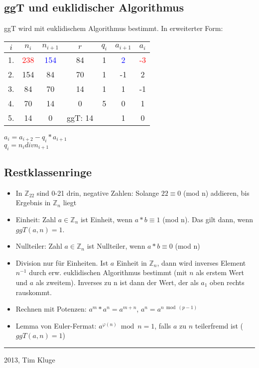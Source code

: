 \documentclass[12pt,landscape]{article}
\begin{document}
\begin{multicols}{3}
\subsection{ggT und euklidischer Algorithmus}
ggT wird mit euklidischem Algorithmus bestimmt. In erweiterter Form:
\begin{tabular}{|c|c|c|c|c|c|c|}
\hline \rule[-2ex]{0pt}{5.5ex} $i$ & $n_i$ & $n_{i+1}$ &  $r$ & $q_i$ & $a_{i+1}$ & $a{_i}$ \\ 
\hline \rule[-2ex]{0pt}{5.5ex} 1. & \textcolor{red}{238} & \textcolor{blue}{154} & 84 & 1 & \textcolor{blue}{2} & \textcolor{red}{-3} \\ 
\hline \rule[-2ex]{0pt}{5.5ex} 2. & 154 &  84 & 70 & 1 & -1 & 2 \\ 
\hline \rule[-2ex]{0pt}{5.5ex} 3. & 84 & 70 & 14 & 1 & 1 & -1 \\ 
\hline \rule[-2ex]{0pt}{5.5ex} 4. & 70 & 14 & 0 & 5 & 0 & 1 \\ 
\hline \rule[-2ex]{0pt}{5.5ex} 5. & 14 & 0 & ggT: 14 &  & 1 & 0 \\ 
\hline 
\end{tabular}
$a_i = a_{i+2} - q_i * a_{i+1}$\\
$q_i = n_i div n_{i+1}$
\subsection{Restklassenringe}
\begin{itemize}
\item In $\mathbb{Z}_{22}$ sind 0-21 drin, negative Zahlen: Solange $22 \equiv 0$ (mod n) addieren, bis Ergebnis in $\mathbb{Z}_{n}$ liegt
\item Einheit: Zahl $a \in \mathbb{Z}_{n}$ ist Einheit, wenn $a * b \equiv 1$ (mod n). Das gilt dann, wenn $ggT(a, n) = 1$.
\item Nullteiler: Zahl $a \in \mathbb{Z}_{n}$ ist Nullteiler, wenn $a * b \equiv 0$ (mod n)
\item Division nur für Einheiten. Ist $a$ Einheit in $\mathbb{Z}_{n}$, dann wird inverses Element $n^{-1}$ durch erw. euklidischen Algorithmus bestimmt (mit $n$ als erstem Wert und $a$ als zweitem). Inverses zu n ist dann der Wert, der als $a_1$ oben rechts rauskommt.
\item Rechnen mit Potenzen: $a^m * a^n = a^{m+n}$, $a^n=a^{n \bmod (p-1)}$ 
\item Lemma von Euler-Fermat: $a^{\varphi(n)} \bmod n = 1$, falls $a$ zu $n$ teilerfremd ist ($ggT(a, n)=1$)
\end{itemize}

\rule{0.3\linewidth}{0.25pt}
\scriptsize

2013, Tim Kluge


\end{multicols}
\end{document}
